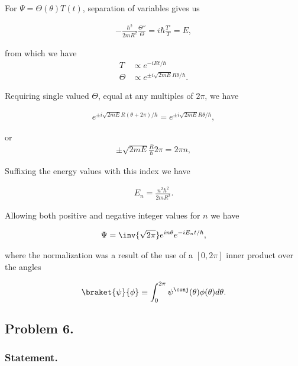 For $\Psi = \Theta(\theta) T(t)$, separation of variables gives us

\begin{align}\label{eqn:desaiCh4:n}
-\frac{\hbar^2}{2m R^2} \frac{\Theta''}{\Theta} = i \hbar \frac{T'}{T} = E,
\end{align}

from which we have
\begin{align}\label{eqn:desaiCh4:504}
T &\propto e^{-i E t/\hbar} \\
\Theta &\propto e^{ \pm i \sqrt{2m E} R \theta/\hbar }.
\end{align}

Requiring single valued $\Theta$, equal at any multiples of $2\pi$, we have

\begin{align*}
e^{ \pm i \sqrt{2m E} R (\theta + 2\pi)/\hbar } = e^{ \pm i \sqrt{2m E} R \theta/\hbar },
\end{align*}

or
\begin{align*}
\pm \sqrt{2m E} \frac{R}{\hbar} 2\pi = 2 \pi n,
\end{align*}

Suffixing the energy values with this index we have

\begin{align}\label{eqn:desaiCh4:505}
E_n = \frac{n^2 \hbar^2}{2 m R^2}.
\end{align}

Allowing both positive and negative integer values for $n$ we have

\begin{align}\label{eqn:desaiCh4:506}
\Psi = \inv{\sqrt{2\pi}} e^{i n \theta} e^{-i E_n t/\hbar},
\end{align}

where the normalization was a result of the use of a $[0,2\pi]$ inner product over the angles

\begin{align}\label{eqn:desaiCh4:507}
\braket{\psi}{\phi} \equiv \int_0^{2\pi} \psi^\conj(\theta) \phi(\theta) d\theta.
\end{align}

\subsection{Problem 6.}
\subsubsection{Statement.}

